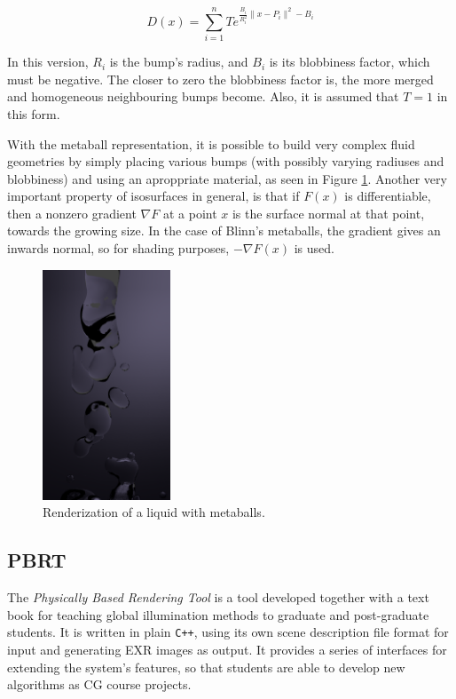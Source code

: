 \documentclass[conference]{acmsiggraph}
\begin{document}
\begin{equation}
  D(x) = \sum_{i=1}^{n} T e^{\frac{B_i}{R_i^2}\|x-P_i\|^2 - B_i}
\end{equation}

In this version, $R_i$ is the bump's radius, and $B_i$ is its blobbiness
factor, which must be negative. The closer to zero the blobbiness factor is,
the more merged and homogeneous neighbouring bumps become. Also, it is assumed
that $T=1$ in this form.

With the metaball representation, it is possible to build very complex fluid
geometries by simply placing various bumps (with possibly varying radiuses and
blobbiness) and using an aproppriate material, as seen in Figure
\ref{img:metaball-liquid}\footnotemark{}. Another very important property of
isosurfaces in general, is that if $F(x)$ is differentiable, then a nonzero
gradient $\nabla F$ at a point $x$ is the surface normal at that point, towards
the growing size. In the case of Blinn's metaballs, the gradient gives an
inwards normal, so for shading purposes, $-\nabla F(x)$ is used.

\begin{figure}[ht]
  \centering
  \includegraphics[width=1.5in]{images/fluid.png}
  \caption{Renderization of a liquid with metaballs.}
  \label{img:metaball-liquid}
\end{figure}


\subsection{PBRT}

The \textit{Physically Based Rendering Tool} is a tool developed together with a
text book \cite{Pharr:2010:PBR:1854996} for teaching global illumination methods
to graduate and post-graduate students. It is written in plain \texttt{C++},
using its own scene description file format for input and generating EXR images
\cite{EXR} as output. It provides a series of interfaces for extending the
system's features, so that students are able to develop new algorithms as CG
course projects.
\end{document}
